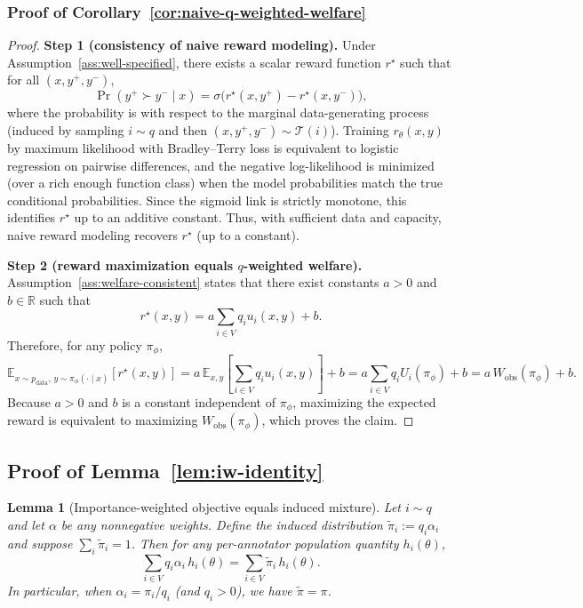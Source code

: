 \documentclass{article}
\newtheorem*{lemma*}{Lemma}
\theoremstyle{plain}
\theoremstyle{definition}
\theoremstyle{remark}
\begin{document}
\subsubsection{Proof of Corollary~\ref{cor:naive-q-weighted-welfare}}
\begin{proof}
\textbf{Step 1 (consistency of naive reward modeling).}
Under Assumption~\ref{ass:well-specified}, there exists a scalar reward function
$r^\star$ such that for all $(x,y^+,y^-)$,
\[
\Pr(y^+ \succ y^- \mid x)
=
\sigma\big(r^\star(x,y^+)-r^\star(x,y^-)\big),
\]
where the probability is with respect to the marginal data-generating process
(induced by sampling $i\sim q$ and then $(x,y^+,y^-)\sim\mathcal{T}(i)$).
Training $r_\theta(x,y)$ by maximum likelihood with Bradley--Terry loss is
equivalent to logistic regression on pairwise differences, and the negative
log-likelihood is minimized (over a rich enough function class) when the model
probabilities match the true conditional probabilities. Since the sigmoid link is
strictly monotone, this identifies $r^\star$ up to an additive constant. Thus,
with sufficient data and capacity, naive reward modeling recovers $r^\star$ (up to a constant).

\textbf{Step 2 (reward maximization equals $q$-weighted welfare).}
Assumption~\ref{ass:welfare-consistent} states that there exist constants
$a > 0$ and $b \in \mathbb{R}$ such that
\[
r^\star(x,y) = a \sum_{i\in V} q_i u_i(x,y) + b.
\]
Therefore, for any policy $\pi_\phi$,
\[
\mathbb{E}_{x\sim p_{\mathrm{data}},\,y\sim\pi_\phi(\cdot\mid x)}[r^\star(x,y)]
=
a \, \mathbb{E}_{x,y}\left[\sum_{i\in V} q_i u_i(x,y)\right] + b
=
a \sum_{i\in V} q_i U_i(\pi_\phi) + b
=
a \, W_{\mathrm{obs}}(\pi_\phi) + b.
\]
Because $a > 0$ and $b$ is a constant independent of $\pi_\phi$, maximizing
the expected reward is equivalent to maximizing $W_{\mathrm{obs}}(\pi_\phi)$,
which proves the claim.
\end{proof}

\subsection{Proof of Lemma~\ref{lem:iw-identity}}
\label{app:proof-iw}

\begin{lemma*}[Importance-weighted objective equals induced mixture]
Let $i \sim q$ and let $\alpha$ be any nonnegative weights. Define the
induced distribution $\tilde\pi_i := q_i \alpha_i$ and suppose
$\sum_i \tilde\pi_i = 1$. Then for any per-annotator population quantity
$h_i(\theta)$,
\begin{equation}
    \sum_{i \in V} q_i \alpha_i \, h_i(\theta)
    =
    \sum_{i \in V} \tilde\pi_i \, h_i(\theta).
\end{equation}
In particular, when $\alpha_i = \pi_i / q_i$ (and $q_i > 0$), we have
$\tilde\pi = \pi$.
\end{lemma*}
\end{document}
